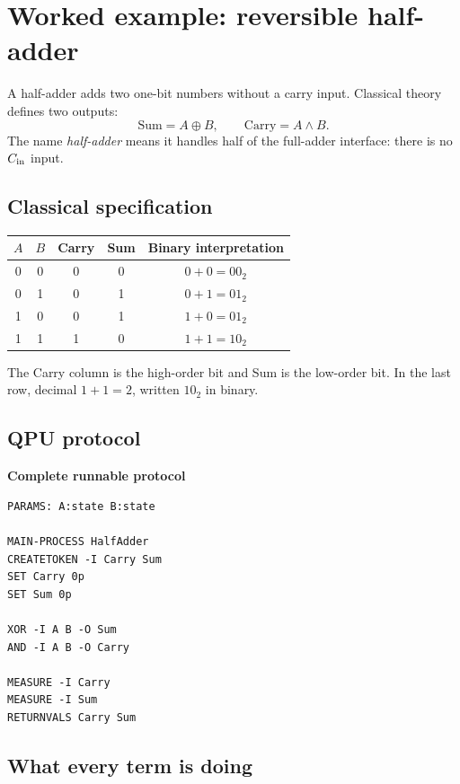 \section{Worked example: reversible half-adder}

A half-adder adds two one-bit numbers without a carry input. Classical theory
defines two outputs:
\[
\mathrm{Sum}=A\oplus B,\qquad
\mathrm{Carry}=A\land B.
\]
The name \emph{half-adder} means it handles half of the full-adder interface:
there is no $C_{\rm in}$ input.

\subsection{Classical specification}

\begin{center}
\begin{tabular}{cc|cc|c}
\toprule
$A$&$B$&Carry&Sum&Binary interpretation\\
\midrule
0&0&0&0&$0+0=00_2$\\
0&1&0&1&$0+1=01_2$\\
1&0&0&1&$1+0=01_2$\\
1&1&1&0&$1+1=10_2$\\
\bottomrule
\end{tabular}
\end{center}
The Carry column is the high-order bit and Sum is the low-order bit. In the
last row, decimal $1+1=2$, written $10_2$ in binary.

\subsection{QPU protocol}

\textbf{Complete runnable protocol}
\begin{lstlisting}
PARAMS: A:state B:state

MAIN-PROCESS HalfAdder
CREATETOKEN -I Carry Sum
SET Carry 0p
SET Sum 0p

XOR -I A B -O Sum
AND -I A B -O Carry

MEASURE -I Carry
MEASURE -I Sum
RETURNVALS Carry Sum
\end{lstlisting}

\subsection{What every term is doing}

